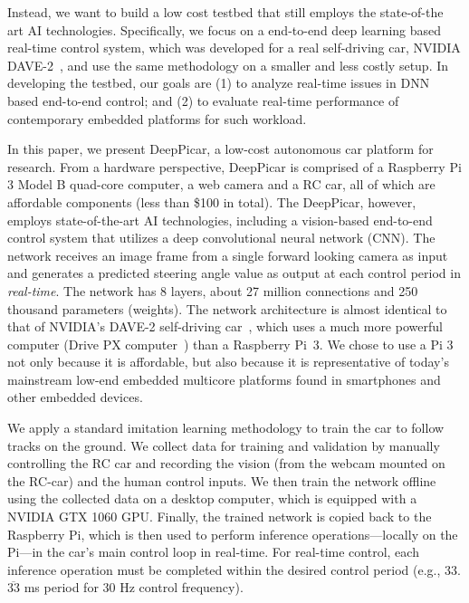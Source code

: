 Instead, we want to build a low cost testbed that still employs the
state-of-the art AI technologies. Specifically, we focus on a end-to-end
deep learning based real-time control system,
which was developed for a real self-driving car, NVIDIA
DAVE-2~\cite{Bojarski2016}, and use the same methodology on a
smaller and less costly setup. In developing the testbed, our
goals are (1) to analyze real-time issues in DNN based end-to-end
control; and (2) to evaluate real-time performance of contemporary embedded
platforms for such workload.

In this paper, we present DeepPicar, a low-cost autonomous car
platform for research. From a hardware perspective,
DeepPicar is comprised of a Raspberry Pi 3 Model B quad-core
computer, a web camera and a RC car, all of which are affordable
components (less than \$100 in total).
The DeepPicar, however, employs state-of-the-art AI
technologies, including a vision-based end-to-end control system that
utilizes a deep convolutional neural network (CNN).
The network receives an image frame from a single forward
looking camera as input and generates a predicted steering angle
value as output at each control period in \emph{real-time}.
The network has 8 layers, about 27 million connections
and 250 thousand parameters (weights).
The network architecture is almost identical to that of NVIDIA's DAVE-2
self-driving car~\cite{Bojarski2016}, which uses a much more powerful
computer (Drive PX computer~\cite{drivepx}) than a Raspberry Pi~3.
We chose to use a Pi 3 not only because it is affordable, but also because it is representative
of today's mainstream low-end embedded multicore platforms found in
smartphones and other embedded devices.


We apply a standard imitation learning methodology to train the car to
follow tracks on the ground. We collect data for
training and validation by manually
controlling the RC car and recording the vision (from the webcam
mounted on the RC-car) and the human control inputs. We then train the
network offline using the collected data on a desktop computer, which
is equipped with a NVIDIA GTX 1060 GPU. Finally, the trained network is copied
back to the Raspberry Pi, which is then used to perform inference
operations---locally on the Pi---in the car's main control loop in
real-time. For real-time control, each inference operation must
be completed within the desired control period (e.g., 33.$\overline{\mbox{33}}$ ms
 period for 30 Hz control frequency).

